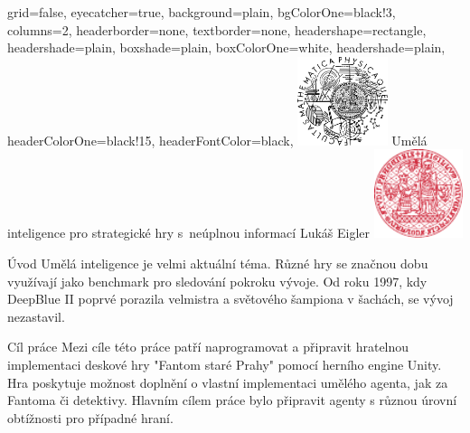\documentclass[portrait,a0paper,fontscale=0.25]{baposter}
\begin{document}
\color{black!80} %
\begin{poster}{grid=false,
	eyecatcher=true,
	background=plain,
	bgColorOne=black!3, %
	columns=2,
	headerborder=none,
	textborder=none,
	headershape=rectangle,
	headershade=plain,
	boxshade=plain,
	boxColorOne=white,
	headershade=plain,
	headerColorOne=black!15, %
	headerFontColor=black,
	}%
	{\includegraphics[height=7em]{logos/mff-black.pdf}}
	{Umělá inteligence pro strategické hry s~neúplnou informací}
	{\vspace{1ex} Lukáš Eigler}
	{\includegraphics[height=7em]{logos/uk-red.pdf}}


%
%

\begin{posterbox}[column=0,name=background]{Úvod}
Umělá inteligence je velmi aktuální téma. Různé hry se značnou dobu využívají jako benchmark pro sledování pokroku vývoje. Od roku 1997, kdy DeepBlue II poprvé porazila velmistra a světového šampiona v šachách, se vývoj nezastavil. 

\end{posterbox}

\begin{posterbox}[column=0, name=goals, below=background]{Cíl práce}
Mezi cíle této práce patří naprogramovat a připravit hratelnou implementaci deskové hry "Fantom staré Prahy" pomocí herního engine Unity. Hra poskytuje možnost doplnění o vlastní implementaci umělého agenta, jak za Fantoma či detektivy. Hlavním cílem práce bylo připravit agenty s různou úrovní obtížnosti pro případné hraní. 


\end{posterbox}
\end{poster}
\end{document}
